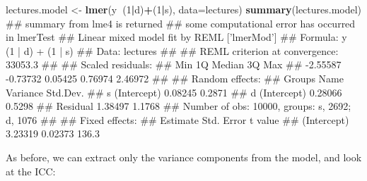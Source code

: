 \documentclass[]{article}
\newenvironment{Shaded}{\begin{snugshade}}{\end{snugshade}}
\newcommand{\KeywordTok}[1]{\textcolor[rgb]{0.13,0.29,0.53}{\textbf{#1}}}
\newcommand{\DataTypeTok}[1]{\textcolor[rgb]{0.13,0.29,0.53}{#1}}
\newcommand{\DecValTok}[1]{\textcolor[rgb]{0.00,0.00,0.81}{#1}}
\newcommand{\StringTok}[1]{\textcolor[rgb]{0.31,0.60,0.02}{#1}}
\newcommand{\OperatorTok}[1]{\textcolor[rgb]{0.81,0.36,0.00}{\textbf{#1}}}
\newcommand{\NormalTok}[1]{#1}
\theoremstyle{definition}
\theoremstyle{definition}
\theoremstyle{definition}
\theoremstyle{remark}
\begin{document}
\begin{Shaded}
\begin{Highlighting}[]
\NormalTok{lectures.model <-}\StringTok{ }\KeywordTok{lmer}\NormalTok{(y}\OperatorTok{~}\NormalTok{(}\DecValTok{1}\OperatorTok{|}\NormalTok{d)}\OperatorTok{+}\NormalTok{(}\DecValTok{1}\OperatorTok{|}\NormalTok{s), }\DataTypeTok{data=}\NormalTok{lectures)}
\KeywordTok{summary}\NormalTok{(lectures.model)}
\NormalTok{## summary from lme4 is returned}
\NormalTok{## some computational error has occurred in lmerTest}
\NormalTok{## Linear mixed model fit by REML ['lmerMod']}
\NormalTok{## Formula: y ~ (1 | d) + (1 | s)}
\NormalTok{##    Data: lectures}
\NormalTok{## }
\NormalTok{## REML criterion at convergence: 33053.3}
\NormalTok{## }
\NormalTok{## Scaled residuals: }
\NormalTok{##      Min       1Q   Median       3Q      Max }
\NormalTok{## -2.55587 -0.73732  0.05425  0.76974  2.46972 }
\NormalTok{## }
\NormalTok{## Random effects:}
\NormalTok{##  Groups   Name        Variance Std.Dev.}
\NormalTok{##  s        (Intercept) 0.08245  0.2871  }
\NormalTok{##  d        (Intercept) 0.28066  0.5298  }
\NormalTok{##  Residual             1.38497  1.1768  }
\NormalTok{## Number of obs: 10000, groups:  s, 2692; d, 1076}
\NormalTok{## }
\NormalTok{## Fixed effects:}
\NormalTok{##             Estimate Std. Error t value}
\NormalTok{## (Intercept)  3.23319    0.02373   136.3}
\end{Highlighting}
\end{Shaded}

As before, we can extract only the variance components from the model,
and look at the ICC:

\begin{Shaded}
\end{Shaded}
\end{document}
